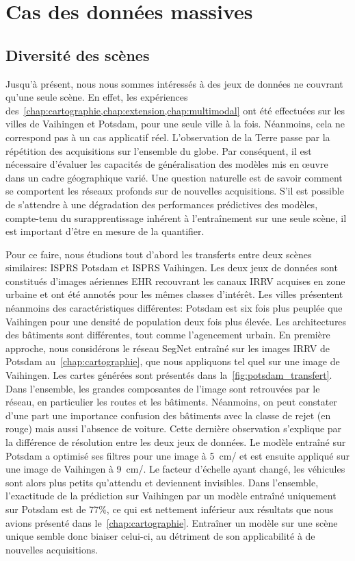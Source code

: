\section{Cas des données massives}

\subsection{Diversité des scènes}

Jusqu'à présent, nous nous sommes intéressés à des jeux de données ne couvrant qu'une seule scène. En effet, les expériences des~\cref{chap:cartographie,chap:extension,chap:multimodal} ont été effectuées sur les villes de Vaihingen et Potsdam, pour une seule ville à la fois. Néanmoins, cela ne correspond pas à un cas applicatif réel. L'observation de la Terre passe par la répétition des acquisitions sur l'ensemble du globe. Par conséquent, il est nécessaire d'évaluer les capacités de généralisation des modèles mis en \oe{}uvre dans un cadre géographique varié. Une question naturelle est de savoir comment se comportent les réseaux profonds sur de nouvelles acquisitions. S'il est possible de s'attendre à une dégradation des performances prédictives des modèles, compte-tenu du surapprentissage inhérent à l'entraînement sur une seule scène, il est important d'être en mesure de la quantifier.

Pour ce faire, nous étudions tout d'abord les transferts entre deux scènes similaires: \gls{ISPRS} Potsdam et \gls{ISPRS} Vaihingen. Les deux jeux de données sont constitués d'images aériennes \gls{EHR} recouvrant les canaux \gls{IRRV} acquises en zone urbaine et ont été annotés pour les mêmes classes d'intérêt. Les villes présentent néanmoins des caractéristiques différentes: Potsdam est six fois plus peuplée que Vaihingen pour une densité de population deux fois plus élevée. Les architectures des bâtiments sont différentes, tout comme l'agencement urbain. En première approche, nous considérons le réseau \gls{SegNet} entraîné sur les images \gls{IRRV} de Potsdam au~\cref{chap:cartographie}, que nous appliquons tel quel sur une image de Vaihingen. Les cartes générées sont présentés dans la~\cref{fig:potsdam_transfert}. Dans l'ensemble, les grandes composantes de l'image sont retrouvées par le réseau, en particulier les routes et les bâtiments. Néanmoins, on peut constater d'une part une importance confusion des bâtiments avec la classe de rejet (en rouge) mais aussi l'absence de voiture. Cette dernière observation s'explique par la différence de résolution entre les deux jeux de données. Le modèle entraîné sur Potsdam a optimisé ses filtres pour une image à \SI{5}{\centi\meter/\px} et est ensuite appliqué sur une image de Vaihingen à \SI{9}{\centi\meter/\px}. Le facteur d'échelle ayant changé, les véhicules sont alors plus petits qu'attendu et deviennent invisibles. Dans l'ensemble, l'exactitude de la prédiction sur Vaihingen par un modèle entraîné uniquement sur Potsdam est de 77\%, ce qui est nettement inférieur aux résultats que nous avions présenté dans le~\cref{chap:cartographie}. Entraîner un modèle sur une scène unique semble donc biaiser celui-ci, au détriment de son applicabilité à de nouvelles acquisitions.


